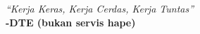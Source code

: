 \documentclass[a4paper, 12pt]{article}
\begin{document}
\begin{jawaban}
\end{jawaban}



\newpage

\vspace*{\fill}
\begin{center} \centering
    \textit{“Kerja Keras, Kerja Cerdas, Kerja Tuntas”} \\
\textbf{-DTE (bukan servis hape)}
\end{center}
\vspace*{\fill}
\end{document}
